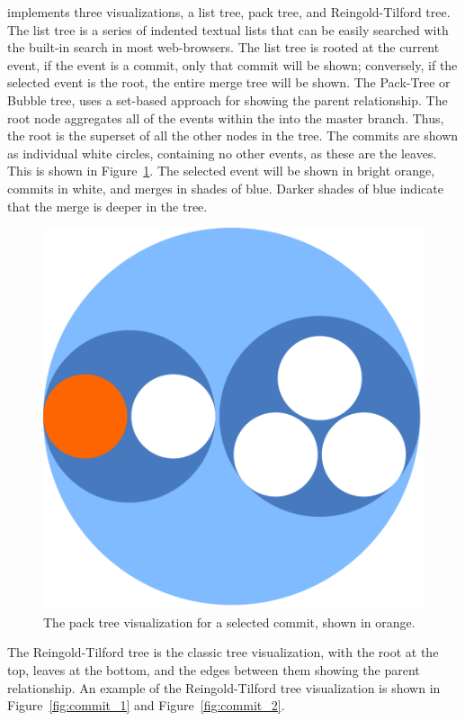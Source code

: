 \documentclass[conference, draftclsnofoot, draft]{IEEEtran}
\begin{document}
\tool implements three visualizations, a list tree, pack tree, and
Reingold-Tilford tree. The list tree is a series of indented textual
lists that can be easily searched with the built-in search in most
web-browsers. The list tree is rooted at the current event, if the event
is a commit, only that commit will be shown; conversely, if the selected
event is the root, the entire merge tree will be shown. The Pack-Tree or
Bubble tree, uses a set-based approach for showing the parent
relationship. The root node aggregates all of the events within the \mt
into the master branch. Thus, the root is the superset of all the other
nodes in the tree. The commits are shown as individual white circles,
containing no other events, as these are the leaves. This is shown in
Figure~\ref{fig:linvis_pack}. The selected event will be shown in bright
orange, commits in white, and merges in shades of blue. Darker shades of
blue indicate that the merge is deeper in the tree.

\begin{figure}[htpb]
  \centering
  \includegraphics[width=0.8\linewidth]{figures/linvis/linvis_bubble.pdf}
  \caption{The pack tree visualization for a selected commit, shown in
    orange.}
  \label{fig:linvis_pack}
\end{figure}

The Reingold-Tilford tree is the classic tree visualization, with the
root at the top, leaves at the bottom, and the edges between them
showing the parent relationship. An example of the Reingold-Tilford tree
visualization is shown in Figure~\ref{fig:commit_1} and
Figure~\ref{fig:commit_2}.
\end{document}
